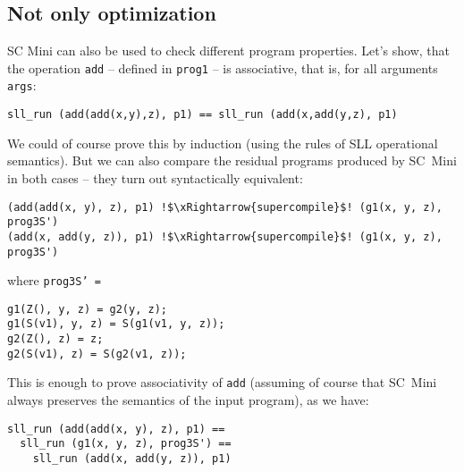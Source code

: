 \subsection{Not only optimization}

% 

%

SC Mini can also be used to check different program properties.
Let's show, that the operation \texttt{add} -- defined in \texttt{prog1} --
is associative, that is, for all arguments \texttt{args}:
\begin{lstlisting}
sll_run (add(add(x,y),z), p1) == sll_run (add(x,add(y,z), p1)
\end{lstlisting}
We could of course prove this by induction (using the rules of SLL operational semantics).
But we can also compare the residual programs produced by SC~Mini in both cases --
they turn out syntactically equivalent:
\begin{lstlisting}[language=sll,escapechar=!]
(add(add(x, y), z), p1) !$\xRightarrow{supercompile}$! (g1(x, y, z), prog3S')
(add(x, add(y, z)), p1) !$\xRightarrow{supercompile}$! (g1(x, y, z), prog3S')
\end{lstlisting}
where \texttt{prog3S' =}
\begin{lstlisting}[language=sll]
g1(Z(), y, z) = g2(y, z);
g1(S(v1), y, z) = S(g1(v1, y, z));
g2(Z(), z) = z;
g2(S(v1), z) = S(g2(v1, z));
\end{lstlisting}
This is enough to prove associativity of \texttt{add} (assuming of course
that SC~Mini always preserves the semantics of the input program), as we have:
\begin{lstlisting}
sll_run (add(add(x, y), z), p1) ==
  sll_run (g1(x, y, z), prog3S') ==
    sll_run (add(x, add(y, z)), p1)
\end{lstlisting}
